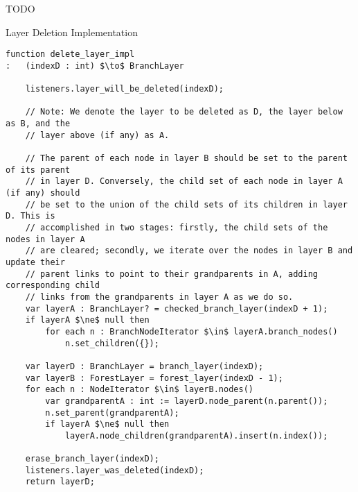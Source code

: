 TODO

\begin{stulisting}[p]
\caption{Layer Deletion Implementation}
\label{code:ipfs-forest-deletelayerimpl}
\begin{lstlisting}[style=Default]
function delete_layer_impl
:	(indexD : int) $\to$ BranchLayer

	listeners.layer_will_be_deleted(indexD);

	// Note: We denote the layer to be deleted as D, the layer below as B, and the
	// layer above (if any) as A.

	// The parent of each node in layer B should be set to the parent of its parent
	// in layer D. Conversely, the child set of each node in layer A (if any) should
	// be set to the union of the child sets of its children in layer D. This is
	// accomplished in two stages: firstly, the child sets of the nodes in layer A
	// are cleared; secondly, we iterate over the nodes in layer B and update their
	// parent links to point to their grandparents in A, adding corresponding child
	// links from the grandparents in layer A as we do so.
	var layerA : BranchLayer? = checked_branch_layer(indexD + 1);
	if layerA $\ne$ null then
		for each n : BranchNodeIterator $\in$ layerA.branch_nodes()
			n.set_children({});

	var layerD : BranchLayer = branch_layer(indexD);
	var layerB : ForestLayer = forest_layer(indexD - 1);
	for each n : NodeIterator $\in$ layerB.nodes()
		var grandparentA : int := layerD.node_parent(n.parent());
		n.set_parent(grandparentA);
		if layerA $\ne$ null then
			layerA.node_children(grandparentA).insert(n.index());

	erase_branch_layer(indexD);
	listeners.layer_was_deleted(indexD);
	return layerD;

\end{lstlisting}
\end{stulisting}

